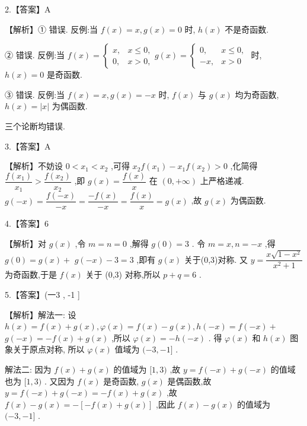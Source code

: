 \documentclass[10pt]{article}
\begin{document}
2.【答案】A

【解析】① 错误. 反例:当 $f\left( x\right)  = x,g\left( x\right)  = 0$ 时, $h\left( x\right)$ 不是奇函数.

② 错误. 反例:当 $f\left( x\right)  = \left\{  {\begin{array}{ll} x, & x \leq  0, \\  0, & x > 0, \end{array}g\left( x\right)  = \left\{  \begin{array}{ll} 0, & x \leq  0, \\   - x, & x > 0 \end{array}\right. }\right.$ 时, $h\left( x\right)  = 0$ 是奇函数.

③ 错误. 反例:当 $f\left( x\right)  = x,g\left( x\right)  =  - x$ 时, $f\left( x\right)$ 与 $g\left( x\right)$ 均为奇函数, $h\left( x\right)  = \left| x\right|$ 为偶函数.

三个论断均错误.

3.【答案】A

【解析】不妨设 $0 < {x}_{1} < {x}_{2}$ ,可得 ${x}_{2}f\left( {x}_{1}\right)  - {x}_{1}f\left( {x}_{2}\right)  > 0$ ,化简得 $\dfrac{f\left( {x}_{1}\right) }{{x}_{1}} > \dfrac{f\left( {x}_{2}\right) }{{x}_{2}}$ ,即 $g\left( x\right)  = \dfrac{f\left( x\right) }{x}$ 在 $\left( {0, + \infty }\right)$ 上严格递减. $g\left( {-x}\right)  = \dfrac{f\left( {-x}\right) }{-x} = \dfrac{-f\left( x\right) }{-x} = \dfrac{f\left( x\right) }{x} = g\left( x\right)$ ,故 $g\left( x\right)$ 为偶函数.

4.【答案】6

【解析】对 $g\left( x\right)$ ,令 $m = n = 0$ ,解得 $g\left( 0\right)  = 3$ . 令 $m = x,n =  - x$ ,得 $g\left( 0\right)  = g\left( x\right)  +$  $g\left( {-x}\right)  - 3 = 3$ ,即有 $g\left( x\right)$ 关于(0,3)对称. 又 $y = \dfrac{x\sqrt{1 - {x}^{2}}}{{x}^{2} + 1}$ 为奇函数,于是 $f\left( x\right)$ 关于 (0,3) 对称,所以 $p + q = 6$ .

5.【答案】(一3 , -1 ]

【解析】解法一: 设 $h\left( x\right)  = f\left( x\right)  + g\left( x\right) ,\varphi \left( x\right)  = f\left( x\right)  - g\left( x\right) ,h\left( {-x}\right)  = f\left( {-x}\right)  +$  $g\left( {-x}\right)  =  - f\left( x\right)  + g\left( x\right)$ ,所以 $\varphi \left( x\right)  =  - h\left( {-x}\right)$ . 得 $\varphi \left( x\right)$ 和 $h\left( x\right)$ 图象关于原点对称, 所以 $\varphi \left( x\right)$ 值域为 $( - 3, - 1\rbrack$ .

解法二: 因为 $f\left( x\right)  + g\left( x\right)$ 的值域为 $\lbrack 1,3)$ ,故 $y = f\left( {-x}\right)  + g\left( {-x}\right)$ 的值域也为 $\lbrack 1,3)$ . 又因为 $f\left( x\right)$ 是奇函数, $g\left( x\right)$ 是偶函数,故 $y = f\left( {-x}\right)  + g\left( {-x}\right)  =  - f\left( x\right)  + g\left( x\right)$ ,故 $f\left( x\right)  - g\left( x\right)  =  - \left\lbrack  {-f\left( x\right)  + g\left( x\right) }\right\rbrack$ ,因此 $f\left( x\right)  - g\left( x\right)$ 的值域为 $( - 3, - 1\rbrack$ .
\end{document}
